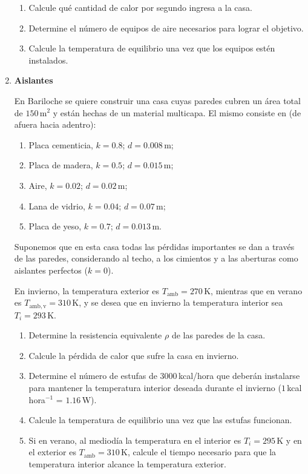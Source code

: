 \documentclass[a4paper,12pt]{article}
\begin{document}
\begin{enumerate}
\begin{enumerate}
\item Calcule qué cantidad de calor por segundo ingresa a la casa.
\item Determine el número de equipos de aire necesarios para lograr el
objetivo.
\item Calcule la temperatura de equilibrio una vez que los equipos estén
instalados.
\end{enumerate}


\item{\bf{Aislantes}}

En Bariloche se quiere construir una casa cuyas paredes cubren un área total de
$150$\,m$^2$ y están hechas de un material multicapa. El mismo consiste en (de
afuera hacia adentro):
\begin{enumerate}
\item Placa cementicia, $k=0.8$; $d=0.008$\,m;
\item Placa de madera, $k=0.5$; $d=0.015$\,m;
\item Aire, $k=0.02$; $d=0.02$\,m;
\item Lana de vidrio, $k=0.04$; $d=0.07$\,m;
\item Placa de yeso, $k=0.7$; $d=0.013$\,m.
\end{enumerate}

Suponemos que en esta casa todas las pérdidas importantes se dan a través de
las paredes, considerando al techo, a los cimientos y a las aberturas como
aislantes perfectos ($k=0$).

En invierno, la temperatura exterior es $T_{\mathrm{amb}}=270$\,K, mientras que en
verano es $T_{\mathrm{amb,v}}=310$\,K, y se desea que en invierno la temperatura
interior sea $T_i=293$\,K.

\begin{enumerate}
\item Determine la resistencia equivalente $\rho$ de las paredes de la casa.
\item Calcule la pérdida de calor que sufre la casa en invierno. 
\item Determine el número de estufas de $3000$\,kcal/hora que deberán
instalarse para mantener la temperatura interior deseada durante el invierno
($1$\,kcal\,hora$^{-1}$ = $1.16$\,W).
\item Calcule la temperatura de equilibrio una vez que las estufas funcionan.
\item Si en verano, al mediodía la temperatura en el interior es $T_i=295$\,K y
en el exterior es $T_{\mathrm{amb}}=310$\,K, calcule el tiempo necesario para que la
temperatura interior alcance la temperatura exterior.
\end{enumerate}


\end{enumerate}
\end{document}

